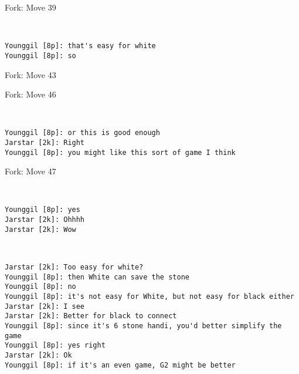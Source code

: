 \documentclass{article}
\begin{document}
\begin{subsection}{Fork: Move 39}
\begin{center}
\cleargoban
{}
\showfullgoban
\\\begin{lstlisting}
Younggil [8p]: that's easy for white
Younggil [8p]: so
\end{lstlisting}
\end{center}
\end{subsection}
\begin{subsection}{Fork: Move 43}
\end{subsection}
\begin{subsection}{Fork: Move 46}
\begin{center}
\cleargoban
{}
\showfullgoban
\\\begin{lstlisting}
Younggil [8p]: or this is good enough
Jarstar [2k]: Right
Younggil [8p]: you might like this sort of game I think
\end{lstlisting}
\end{center}
\end{subsection}
\begin{subsection}{Fork: Move 47}
\begin{center}
\cleargoban
{}
\showfullgoban
\\\begin{lstlisting}
Younggil [8p]: yes
Jarstar [2k]: Ohhhh
Jarstar [2k]: Wow
\end{lstlisting}
\end{center}
\begin{center}
\cleargoban
{}
\showfullgoban
\\\begin{lstlisting}
Jarstar [2k]: Too easy for white?
Younggil [8p]: then White can save the stone
Younggil [8p]: no
Younggil [8p]: it's not easy for White, but not easy for black either
Jarstar [2k]: I see
Jarstar [2k]: Better for black to connect
Younggil [8p]: since it's 6 stone handi, you'd better simplify the game
Younggil [8p]: yes right
Jarstar [2k]: Ok
Younggil [8p]: if it's an even game, G2 might be better
\end{lstlisting}
\end{center}
\end{subsection}
\end{document}
